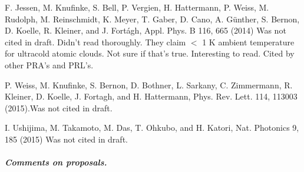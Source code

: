 \documentclass[10pt,twocolumn]{article}
\begin{document}
\begin{thebibliography}{8}
 F. Jessen, M. Knufinke, S. Bell, P. Vergien, H. Hattermann, P. Weiss, M. Rudolph, M. Reinschmidt, K. Meyer, T. Gaber, D. Cano, A. G\"unther, S. Bernon, D. Koelle, R. Kleiner, and J. Fort\'agh, Appl. Phys. B 116, 665 (2014) \textcolor{RedOrange}{Was not cited in draft. Didn't read thoroughly. They claim $<$ 1 K ambient temperature for ultracold atomic clouds. Not sure if that's true. Interesting to read. Cited by other PRA's and PRL's.}

  P. Weiss, M. Knufinke, S. Bernon, D. Bothner, L. Sarkany, C. Zimmermann, R. Kleiner, D. Koelle, J. Fortagh, and H. Hattermann, Phys. Rev. Lett. 114, 113003 (2015).\textcolor{RedOrange}{Was not cited in draft.}

 I. Ushijima, M. Takamoto, M. Das, T. Ohkubo, and H. Katori, Nat. Photonics 9, 185 (2015) \textcolor{RedOrange}{Was not cited in draft.}
\end{thebibliography}

\subparagraph{Comments on proposals.}
\end{document}
